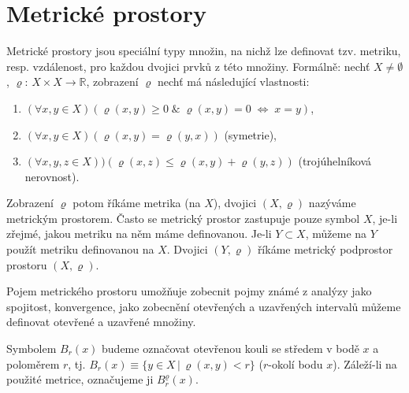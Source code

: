 \chapter{Metrické prostory}

Metrické prostory jsou speciální typy množin, na nichž lze definovat tzv.
metriku, resp. vzdálenost, pro každou dvojici prvků z této množiny.
Formálně: nechť $X\neq\emptyset$, $\varrho:\,X\times X\rightarrow\mathbb{R}$,
zobrazení­ $\varrho$ nechť má následující­ vlastnosti:
\begin{enumerate}
\renewcommand{\theenumi}{M\arabic{enumi}}
   \item $(\forall x,y\in X)(\varrho(x,y)\geq 0\;\&\;\varrho(x,y)=0\; 
                 \Leftrightarrow\;x=y)$,\label{item:m1}
   \item $(\forall x,y\in X)(\varrho(x,y)=\varrho(y,x))$ (symetrie),
   \item $(\forall x,y,z\in X))(\varrho(x,z)\leq\varrho(x,y)+\varrho(y,z))$  
          (trojúhelní­ková nerovnost).\label{item:m3}
\end{enumerate}
Zobrazení $\varrho$ potom říkáme metrika (na $X$), dvojici $(X,\varrho)$ 
nazýváme metrickým prostorem.
Často se metrický prostor zastupuje pouze symbol $X$, je-li zřejmé, jakou
metriku na něm máme definovanou.
Je-li $Y\subset X$, můžeme na $Y$ použít metriku definovanou na $X$.
Dvojici $(Y,\varrho)$ říkáme metrický podprostor prostoru $(X,\varrho)$.

Pojem metrického prostoru umožňuje zobecnit pojmy známé z analýzy
jako spojitost, konvergence, jako zobecnění otevřených a uzavřených intervalů
můžeme definovat otevřené a uzavřené množiny.

Symbolem $B_r(x)$ budeme označovat otevřenou kouli se středem v bodě $x$
a poloměrem $r$, tj. $B_r(x)\equiv\{y\in X\,|\,\varrho(x,y)<r\}$
($r$-okolí bodu $x$).
Záleží-li na použité metrice, označujeme ji $B_r^{\varrho}(x)$.

